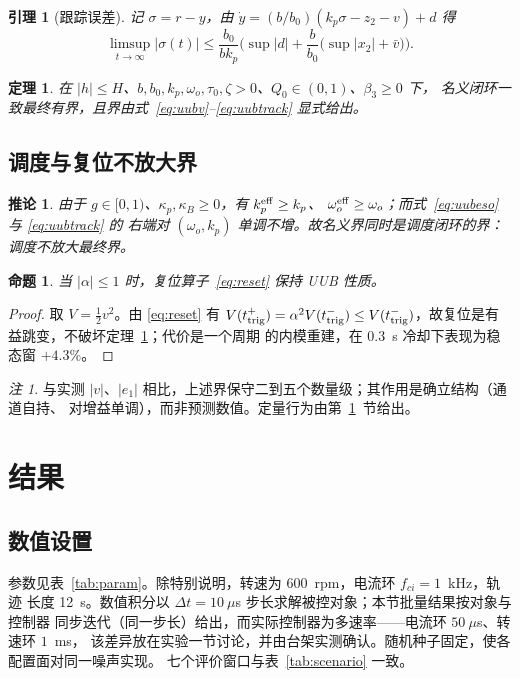 \documentclass[journal]{IEEEtran}
\newtheorem{lemma}{引理}
\newtheorem{theorem}{定理}
\newtheorem{proposition}{命题}
\newtheorem{corollary}{推论}
\theoremstyle{remark}
\newtheorem{remark}{注}
\begin{document}
\begin{lemma}[跟踪误差]\label{lem:track}
记 $\sigma=r-y$，由 $\dot y=(b/b_0)(k_p\sigma-z_2-v)+d$ 得
\begin{equation}
\limsup_{t\to\infty}|\sigma(t)|\le\frac{b_0}{bk_p}
\Big(\sup|d|+\frac{b}{b_0}\big(\sup|x_2|+\bar v\big)\Big).
\label{eq:uubtrack}
\end{equation}
\end{lemma}

\begin{theorem}\label{thm:uub}
在 $|h|\le H$、$b,b_0,k_p,\omega_o,\tau_0,\zeta>0$、$Q_0\in(0,1)$、$\beta_3\ge0$ 下，
名义闭环一致最终有界，且界由式~\eqref{eq:uubv}--\eqref{eq:uubtrack} 显式给出。
\end{theorem}

\subsection{调度与复位不放大界}
\begin{corollary}\label{cor:schedule}
由于 $g\in[0,1)$、$\kappa_p,\kappa_B\ge0$，有 $k_p^{\rm eff}\ge k_p$、
$\omega_o^{\rm eff}\ge\omega_o$；而式~\eqref{eq:uubeso} 与 \eqref{eq:uubtrack} 的
右端对 $(\omega_o,k_p)$ 单调不增。故名义界同时是调度闭环的界：调度不放大最终界。
\end{corollary}
\begin{proposition}\label{prop:reset}
当 $|\alpha|\le1$ 时，复位算子~\eqref{eq:reset} 保持 UUB 性质。
\end{proposition}
\begin{proof}
取 $V=\tfrac12 v^2$。由 \eqref{eq:reset} 有 $V(t_{\rm trig}^+)=\alpha^2V(t_{\rm trig}^-)
\le V(t_{\rm trig}^-)$，故复位是有益跳变，不破坏定理~\ref{thm:uub}；代价是一个周期
的内模重建，在 $0.3$~s 冷却下表现为稳态窗 $+4.3\%$。
\end{proof}

\begin{remark}
与实测 $|v|$、$|e_1|$ 相比，上述界保守二到五个数量级；其作用是确立结构（通道自持、
对增益单调），而非预测数值。定量行为由第~\ref{sec:results}~节给出。
\end{remark}

\section{结果}\label{sec:results}

\subsection{数值设置}
参数见表~\ref{tab:param}。除特别说明，转速为 600~rpm，电流环 $f_{ci}=1$~kHz，轨迹
长度 12~s。数值积分以 $\Delta t=10~\mu$s 步长求解被控对象；本节批量结果按对象与控制器
同步迭代（同一步长）给出，而实际控制器为多速率——电流环 $50~\mu$s、转速环 $1$~ms，
该差异放在实验一节讨论，并由台架实测确认。随机种子固定，使各配置面对同一噪声实现。
七个评价窗口与表~\ref{tab:scenario} 一致。
\end{document}
